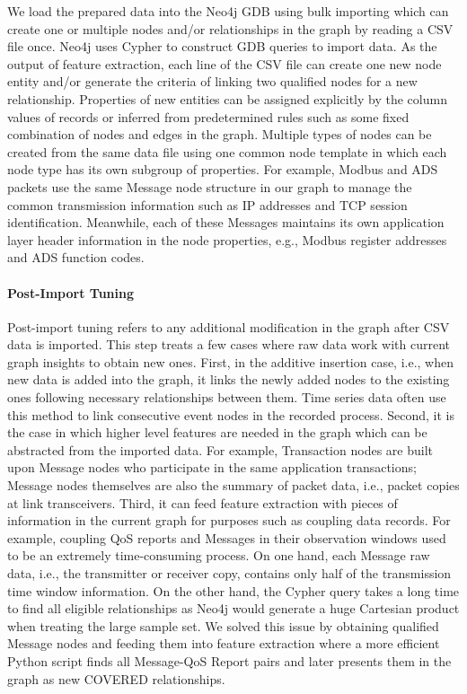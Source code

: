 We load the prepared data into the Neo4j GDB using bulk importing which can create one or multiple nodes and/or relationships in the graph by reading a CSV file once. 
Neo4j uses Cypher to construct GDB queries to import data.
As the output of feature extraction, each line of the CSV file can create one new node entity and/or generate the criteria of linking two qualified nodes for a new relationship. Properties of new entities can be assigned explicitly by the column values of records or inferred from predetermined rules such as some fixed combination of nodes and edges in the graph. Multiple types of nodes can be created from the same data file using one common node template in which each node type has its own subgroup of properties. For example, Modbus and ADS packets use the same Message node structure in our graph to manage the common transmission information such as IP addresses and TCP session identification. Meanwhile, each of these Messages maintains its own application layer header information in the node properties, e.g., Modbus register addresses and ADS function codes.   


\paragraph{Post-Import Tuning}

Post-import tuning refers to any additional modification in the graph after CSV data is imported. This step treats a few cases where raw data work with current graph insights to obtain new ones. First, in the additive insertion case, i.e., when new data is added into the graph, it links the newly added nodes to the existing ones following necessary relationships between them. Time series data often use this method to link consecutive event nodes in the recorded process.
Second, it is the case in which higher level features are needed in the graph which can be abstracted from the imported data. For example, Transaction nodes are built upon Message nodes who participate in the same application transactions; Message nodes themselves are also the summary of packet data, i.e., packet copies at link transceivers. Third, it can feed feature extraction with pieces of information in the current graph for purposes such as coupling data records. For example, coupling QoS reports and Messages in their observation windows used to be an extremely time-consuming process. On one hand, each Message raw data, i.e., the transmitter or receiver copy, contains only half of the transmission time window information. On the other hand, the Cypher query takes a long time to find all eligible relationships as Neo4j would generate a huge Cartesian product when treating the large sample set. We solved this issue by obtaining qualified Message nodes and feeding them into feature extraction where a more efficient Python script finds all Message-QoS Report pairs and later presents them in the graph as new COVERED relationships. 


